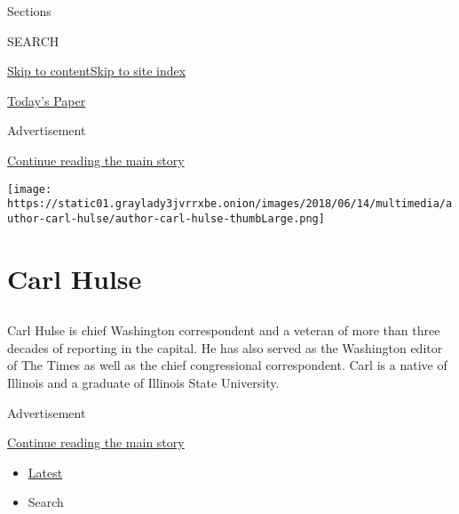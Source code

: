 Sections

SEARCH

\protect\hyperlink{site-content}{Skip to
content}\protect\hyperlink{site-index}{Skip to site index}

\href{https://myaccount.nytimes3xbfgragh.onion/auth/login?response_type=cookie\&client_id=vi}{}

\href{https://www.nytimes3xbfgragh.onion/section/todayspaper}{Today's
Paper}

Advertisement

\protect\hyperlink{after-top}{Continue reading the main story}

\texttt{[image: https://static01.graylady3jvrrxbe.onion/images/2018/06/14/multimedia/author-carl-hulse/author-carl-hulse-thumbLarge.png]}

\hypertarget{carl-hulse}{%
\section{Carl Hulse}\label{carl-hulse}}

\subsection{}

Carl Hulse is chief Washington correspondent and a veteran of more than
three decades of reporting in the capital. He has also served as the
Washington editor of The Times as well as the chief congressional
correspondent. Carl is a native of Illinois and a graduate of Illinois
State University.~

Advertisement

\protect\hyperlink{after-mid1}{Continue reading the main story}

\begin{itemize}
\tightlist
\item
  \protect\hyperlink{stream-panel}{Latest}
\item
  Search
\end{itemize}

